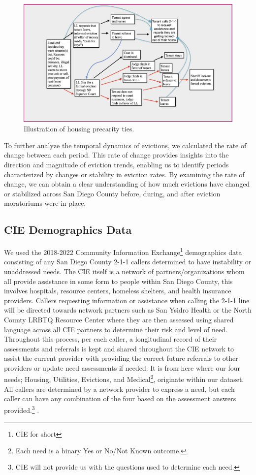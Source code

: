 \documentclass[man, 12pt, donotrepeattitle, floatsintext]{apa7} %
\begin{document}
\begin{figure}[H]
  \includegraphics[width=\linewidth]{figures/housing_precarity_tree.png}
  \caption{Illustration of housing precarity ties.}
  \label{fig:housing_precarity_tree}
\end{figure}


To further analyze the temporal dynamics of evictions, we calculated the rate of change between each period. This rate of change provides insights into the direction and magnitude of eviction trends, enabling us to identify periods characterized by changes or stability in eviction rates. By examining the rate of change, we can obtain a clear understanding of how much evictions have changed or stabilized across San Diego County before, during, and after eviction moratoriums were in place. 



\subsection{CIE Demographics Data}

We used the 2018-2022 Community Information Exchange\footnote{CIE for short} demographics data consisting of any San Diego County 2-1-1 callers determined to have instability or unaddressed needs. The CIE itself is a network of partners/organizations whom all provide assistance in some form to people within San Diego County, this involves hospitals, resource centers, homeless shelters, and health insurance providers. Callers requesting information or assistance when calling the 2-1-1 line will be directed towards network partners such as San Ysidro Health or the North County LRBTQ Resource Center where they are then assessed using shared language across all CIE partners to determine their risk and level of need. Throughout this process, per each caller, a longitudinal record of their assessments and referrals is kept and shared throughout the CIE network to assist the current provider with providing the correct future referrals to other providers or update need assessments if needed. It is from here where our four needs; Housing, Utilities, Evictions, and Medical\footnote{Each need is a binary Yes or No/Not Known outcome.}, originate within our dataset. All callers are determined by a network provider to express a need, but each caller can have any combination of the four based on the assessment answers provided.\footnote{CIE will not provide us with the questions used to determine each need.} \parencite{CIE_webpage}.
\end{document}
